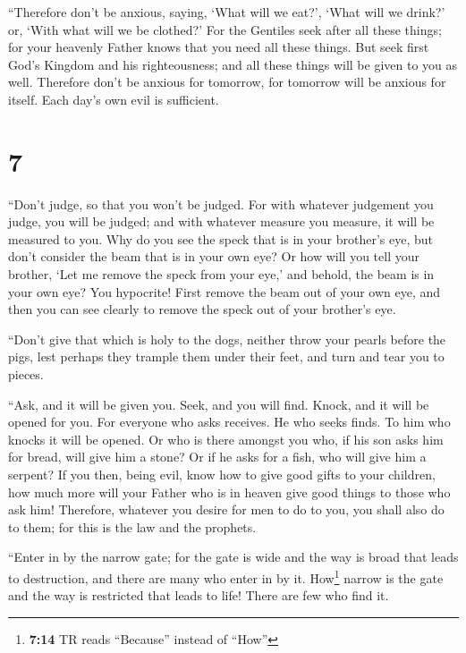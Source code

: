  ``Therefore don't be anxious, saying, `What will we
eat?', `What will we drink?' or, `With what will we be clothed?'
 For the Gentiles seek after all these things; for your
heavenly Father knows that you need all these things. 
But seek first God's Kingdom and his righteousness; and all these things
will be given to you as well.  Therefore don't be anxious
for tomorrow, for tomorrow will be anxious for itself. Each day's own
evil is sufficient.

\hypertarget{section-6}{%
\section{7}\label{section-6}}

 ``Don't judge, so that you won't be judged.
 For with whatever judgement you judge, you will be
judged; and with whatever measure you measure, it will be measured to
you.  Why do you see the speck that is in your brother's
eye, but don't consider the beam that is in your own eye? 
Or how will you tell your brother, `Let me remove the speck from your
eye,' and behold, the beam is in your own eye?  You
hypocrite! First remove the beam out of your own eye, and then you can
see clearly to remove the speck out of your brother's eye.

 ``Don't give that which is holy to the dogs, neither
throw your pearls before the pigs, lest perhaps they trample them under
their feet, and turn and tear you to pieces.

 ``Ask, and it will be given you. Seek, and you will find.
Knock, and it will be opened for you.  For everyone who
asks receives. He who seeks finds. To him who knocks it will be opened.
 Or who is there amongst you who, if his son asks him for
bread, will give him a stone?  Or if he asks for a fish,
who will give him a serpent?  If you then, being evil,
know how to give good gifts to your children, how much more will your
Father who is in heaven give good things to those who ask him!
 Therefore, whatever you desire for men to do to you, you
shall also do to them; for this is the law and the prophets.

 ``Enter in by the narrow gate; for the gate is wide and
the way is broad that leads to destruction, and there are many who enter
in by it.  How\footnote{\textbf{7:14} TR reads
  ``Because'' instead of ``How''} narrow is the gate and the way is
restricted that leads to life! There are few who find it.


